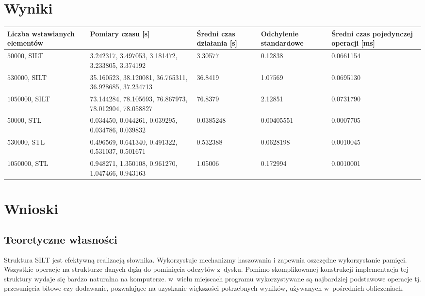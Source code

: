 \documentclass[declaration,shortabstract,masc]{iithesis}
\begin{document}
		\section{Wyniki}
			\begin{tabular}{|p{62pt}|p{62pt}|p{62pt}|p{62pt}|p{62pt}|}
				\hline
				Liczba wstawianych elementów & Pomiary czasu [s] & Średni czas działania [s] & Odchylenie standardowe & Średni czas pojedynczej operacji [ms]\\
				\hline
				$50000$, SILT & 3.242317, 3.497053, 3.181472, 3.233805, 3.374192 & 3.30577 & 0.12838 & 0.0661154\\
				\hline
				$530000$, SILT & 35.160523, 38.120081, 36.765311, 36.928685, 37.234713 & 36.8419 & 1.07569 & 0.0695130\\
				\hline
				$1050000$, SILT & 73.144284, 78.105693, 76.867973, 78.012904, 78.058827 & 76.8379 & 2.12851 & 0.0731790\\
				\hline
				$50000$, STL & 0.034450, 0.044261, 0.039295, 0.034786, 0.039832 & 0.0385248 & 0.00405551 & 0.0007705\\
				\hline
				$530000$, STL & 0.496569, 0.641340, 0.491322, 0.531037, 0.501671 & 0.532388 & 0.0628198 & 0.0010045\\
				\hline
				$1050000$, STL & 0.948271, 1.350108, 0.961270, 1.047466, 0.943163 & 1.05006 & 0.172994 & 0.0010001\\
				\hline
			\end{tabular}
		\section{Wnioski}
			\subsection{Teoretyczne własności}
				Struktura SILT jest efektywną realizacją słownika. Wykorzystuje mechanizmy haszowania i zapewnia oszczędne wykorzystanie pamięci. Wszystkie operacje na strukturze danych dążą do pominięcia odczytów z~dysku. Pomimo skomplikowanej konstrukcji implementacja tej struktury wydaje się bardzo naturalna na komputerze. w~wielu miejscach programu wykorzystywane są najbardziej podstawowe operacje tj. przesunięcia bitowe czy dodawanie, pozwalające na uzyskanie większości potrzebnych wyników, używanych w~pośrednich obliczeniach.
\end{document}
